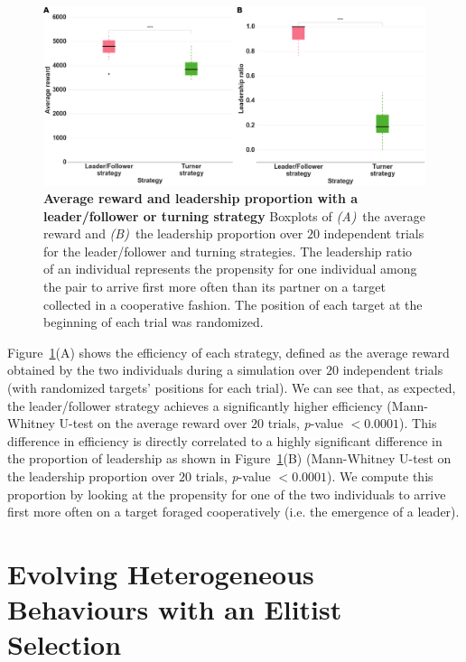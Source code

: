   \begin{figure}[ht]
    \centerfloat
      \includegraphics[scale=0.9]{fig/ArticleRob2/figEffAndLead.png}
    \caption{\textbf{Average reward and leadership proportion with a leader/follower or turning strategy} Boxplots of {\em (A)}~the average reward and {\em (B)}~the leadership proportion over $20$ independent trials for the leader/follower and turning strategies. The leadership ratio of an individual represents the propensity for one individual among the pair to arrive first more often than its partner on a target collected in a cooperative fashion. The position of each target at the beginning of each trial was randomized.}
    \label{fig:EfficiencyAndLeadership}
  \end{figure}

  Figure~\ref{fig:EfficiencyAndLeadership}(A) shows the efficiency of each strategy, defined as the average reward obtained by the two individuals during a simulation over $20$ independent trials (with randomized targets' positions for each trial). We can see that, as expected, the leader/follower strategy achieves a significantly higher efficiency (Mann-Whitney U-test on the average reward over $20$ trials, {\em p}-value $< 0.0001$). This difference in efficiency is directly correlated to a highly significant difference in the proportion of leadership as shown in Figure~\ref{fig:EfficiencyAndLeadership}(B) (Mann-Whitney U-test on the leadership proportion over $20$ trials, {\em p}-value $< 0.0001$). We compute this proportion by looking at the propensity for one of the two individuals to arrive first more often on a target foraged cooperatively (i.e. the emergence of a leader).



\section{Evolving Heterogeneous Behaviours with an Elitist Selection}
\label{sec:elitistEvolution}
